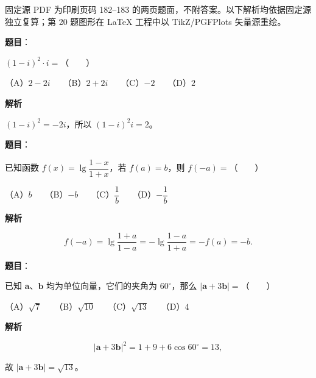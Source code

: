 

\begin{gktip}
固定源 PDF 为印刷页码 182–183 的两页题面，不附答案。以下解析均依据固定源独立复算；第 20 题图形在 LaTeX 工程中以 TikZ/PGFPlots 矢量源重绘。
\end{gktip}

\begin{answer}

\textbf{题目}：

$(1-i)^2\cdot i=$\mbox{（　　）}

（A）$2-2i$　　（B）$2+2i$　　（C）$-2$　　（D）$2$

\textbf{解析}

$(1-i)^2=-2i$，所以 $(1-i)^2i=2$。


\end{answer}
\begin{answer}

\textbf{题目}：

已知函数 $f(x)=\lg\dfrac{1-x}{1+x}$，若 $f(a)=b$，则 $f(-a)=$\mbox{（　　）}

（A）$b$　　（B）$-b$　　（C）$\dfrac1b$　　（D）$-\dfrac1b$

\textbf{解析}

\nopagebreak[4]
\[
f(-a)=\lg\frac{1+a}{1-a}
=-\lg\frac{1-a}{1+a}
=-f(a)=-b.
\]


\end{answer}
\begin{answer}

\textbf{题目}：

已知 $\boldsymbol a\text{、}\boldsymbol b$ 均为单位向量，它们的夹角为 $60^\circ$，那么 $|\boldsymbol a+3\boldsymbol b|=$\mbox{（　　）}

（A）$\sqrt7$　　（B）$\sqrt{10}$　　（C）$\sqrt{13}$　　（D）$4$

\textbf{解析}

\nopagebreak[4]
\[
|\boldsymbol a+3\boldsymbol b|^2
=1+9+6\cos60^\circ=13,
\]

故 $|\boldsymbol a+3\boldsymbol b|=\sqrt{13}$。


\end{answer}
